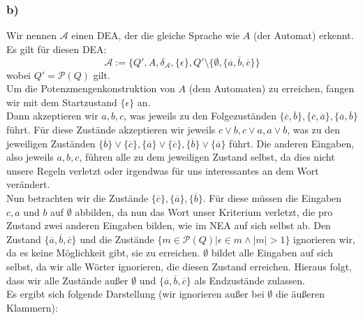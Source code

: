 \documentclass[12pt, a4paper]{article}
\begin{document}
\subsubsection*{b)}
Wir nennen \(\mathcal A\) einen DEA, der die gleiche Sprache wie \(A\) (der Automat) erkennt. Es gilt für diesen DEA:
\[\mathcal A := \{Q', A, \delta_{\mathcal A}, \{\epsilon\}, Q' \setminus \{\emptyset, \{\overline{a}, \overline{b}, \overline{c}\}\}\] wobei \(Q' = \mathcal{P}(Q)\) gilt. \pagebreak \\
Um die Potenzmengenkonstruktion von \(A\) (dem Automaten) zu erreichen, fangen wir mit dem Startzustand \(\{\epsilon\}\) an. \\
Dann akzeptieren wir \(a, b, c\), was jeweils zu den Folgezuständen \(\{\overline{c}, \overline{b}\}, \{\overline{c}, \overline{a}\}, \{\overline{a}, \overline{b}\}\) führt. Für diese Zustände akzeptieren wir jeweils \(c\vee b, c \vee a, a \vee b\), was zu den jeweiligen Zuständen \(\{\overline{b}\} \vee \{\overline{c}\}, \{\overline{a}\} \vee \{\overline{c}\}, \{\overline{b}\} \vee \{\overline{a}\}\) führt. Die anderen Eingaben, also jeweils \(a, b,c\), führen alle zu dem jeweiligen Zustand selbst, da dies nicht unsere Regeln verletzt oder irgendwas für uns interessantes an dem Wort verändert. \\
Nun betrachten wir die Zustände \(\{\overline{c}\}, \{\overline{a}\}, \{\overline{b}\}\). Für diese müssen die Eingaben \(c, a\) und \(b\) auf \(\emptyset\) abbilden, da nun das Wort unser Kriterium verletzt, die pro Zustand zwei anderen Eingaben bilden, wie im NEA auf sich selbst ab. Den Zustand \(\{\overline{a}, \overline{b}, \overline{c}\}\) und die Zustände \(\{m \in \mathcal P(Q) | \epsilon \in m \wedge |m| > 1\}\) ignorieren wir, da es keine Möglichkeit gibt, sie zu erreichen. \(\emptyset\) bildet alle Eingaben auf sich selbst, da wir alle Wörter ignorieren, die diesen Zustand erreichen. Hieraus folgt, dass wir alle Zustände außer \(\emptyset\) und \(\{\overline{a}, \overline{b}, \overline{c}\}\) als Endzustände zulassen. \\
Es ergibt sich folgende Darstellung (wir ignorieren außer bei \(\emptyset\) die äußeren Klammern): \vspace*{-0.5cm}
\end{document}
